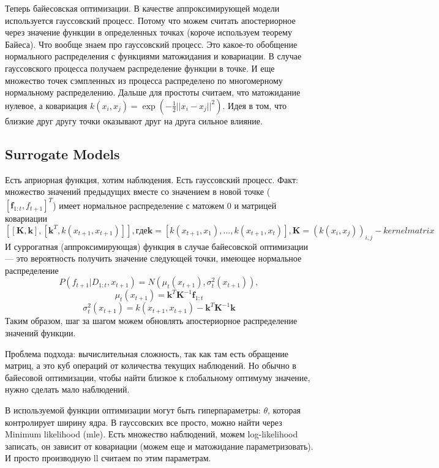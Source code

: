 Теперь байесовская оптимизации. В качестве аппроксимирующей модели используется гауссовский процесс. Потому что можем считать апостериорное через значение функции в определенных точках (короче используем теорему Байеса). Что вообще знаем про гауссовский процесс. Это какое-то обобщение нормального распределения с функциями матожидания и ковариации. В случае гауссовского процесса получаем распределение функции в точке. И еще множество точек сэмпленных из процесса распределено по многомерному нормальному распределению. Дальше для простоты считаем, что матожидание нулевое, а ковариация $k(x_i, x_j) = \exp(-\frac{1}{2}||x_i - x_j||^2)$. Идея в том, что близкие друг другу точки оказывают друг на друга сильное влияние.

\subsection{Surrogate Models}
Есть априорная функция, хотим наблюдения. Есть гауссовский процесс. Факт: множество значений предыдущих вместе со значением в новой точке ($[\textbf{f}_{1:t}, f_{t+1}]^T$) имеет нормальное распределение с матожем 0 и матрицей ковариации
$$[[\textbf{K}, \textbf{k}], [\textbf{k}^T, k(x_{t+1}, x_{t+1})]], где \textbf{k}=[k(x_{t+1}, x_1), ..., k(x_{t+1}, x_t)], \textbf{K}=(k(x_i, x_j))_{i,j} - kernel matrix$$
И суррогатная (аппроксимирующая) функция в случае байесовской оптимизации --- это вероятность получить значение следующей точки, имеющее нормальное распределение $$P(f_{t+1}|D_{1:t}, x_{t+1}) = \textit{N}(\mu_t(x_{t+1}), \sigma_t^2(x_{t+1})),$$
$$\mu_t(x_{t+1}) = \textbf{k}^T\textbf{K}^{-1}\textbf{f}_{1:t}$$
$$\sigma_t^2(x_{t+1}) = k(x_{t+1}, x_{t+1}) - \textbf{k}^T\textbf{K}^{-1}\textbf{k}$$
Таким образом, шаг за шагом можем обновлять апостериорное распределение значений функции.

Проблема подхода: вычислительная сложность, так как там есть обращение матриц, а это куб операций от количества текущих наблюдений. Но обычно в байесовой оптимизации, чтобы найти близкое к глобальному оптимуму значение, нужно сделать мало наблюдений. 
    
В используемой функции оптимизации могут быть гиперпараметры: $\theta$, которая контролирует ширину ядра. В гауссовских все просто, можно найти через Minimum likelihood (mle). Есть множество наблюдений, можем log-likelihood записать, он зависит от ковариации (можем еще и матожидание параметризовать). И просто производную ll считаем по этим параметрам.

